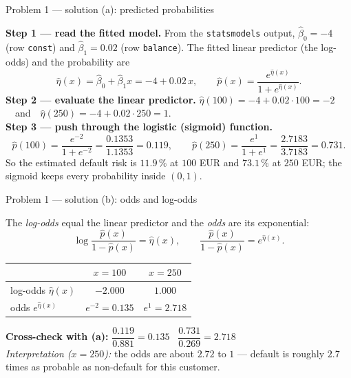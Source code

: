 \documentclass[aspectratio=169,11pt]{beamer}
\begin{document}
\begin{frame}{Problem 1 --- solution (a): predicted probabilities}
  \begin{solutionbox}
    \textbf{Step 1 --- read the fitted model.} From the \texttt{statsmodels} output,
    $\hat{\beta}_0=-4$ (row \texttt{const}) and $\hat{\beta}_1=0.02$ (row \texttt{balance}).
    The fitted linear predictor (the log-odds) and the probability are
    \[
      \hat{\eta}(x)=\hat{\beta}_0+\hat{\beta}_1 x=-4+0.02\,x,
      \qquad
      \hat{p}(x)=\frac{e^{\hat{\eta}(x)}}{1+e^{\hat{\eta}(x)}} .
    \]
    \textbf{Step 2 --- evaluate the linear predictor.}\quad
    $\hat{\eta}(100)=-4+0.02\cdot 100=-2$\ \ and\ \ $\hat{\eta}(250)=-4+0.02\cdot 250=1$.\\[0.5mm]
    \textbf{Step 3 --- push through the logistic (sigmoid) function.}
    \[
      \hat{p}(100)=\frac{e^{-2}}{1+e^{-2}}=\frac{0.1353}{1.1353}=\mathbf{0.119},
      \qquad
      \hat{p}(250)=\frac{e^{1}}{1+e^{1}}=\frac{2.7183}{3.7183}=\mathbf{0.731}.
    \]
    So the estimated default risk is $11.9\,\%$ at $100$ EUR and $73.1\,\%$ at $250$ EUR; the
    sigmoid keeps every probability inside $(0,1)$.
  \end{solutionbox}
\end{frame}

\begin{frame}{Problem 1 --- solution (b): odds and log-odds}
  \begin{solutionbox}
    The \emph{log-odds} equal the linear predictor and the \emph{odds} are its exponential:
    \[
      \log\!\frac{\hat{p}(x)}{1-\hat{p}(x)}=\hat{\eta}(x),
      \qquad
      \frac{\hat{p}(x)}{1-\hat{p}(x)}=e^{\hat{\eta}(x)} .
    \]
    \begin{center}
    \begin{tabular}{lcc}
      \toprule
       & $x=100$ & $x=250$\\
      \midrule
      log-odds $\hat{\eta}(x)$ & $-2.000$ & $1.000$\\
      odds $e^{\hat{\eta}(x)}$ & $e^{-2}=0.135$ & $e^{1}=2.718$\\
      \bottomrule
    \end{tabular}
    \end{center}
    \textbf{Cross-check with (a):}\quad
    $\dfrac{0.119}{0.881}=0.135$~\checkmark\qquad
    $\dfrac{0.731}{0.269}=2.718$~\checkmark\\[0.5mm]
    \emph{Interpretation ($x=250$):} the odds are about $2.72$ to $1$ --- default is roughly
    $2.7$ times as probable as non-default for this customer.
  \end{solutionbox}
\end{frame}
\end{document}
